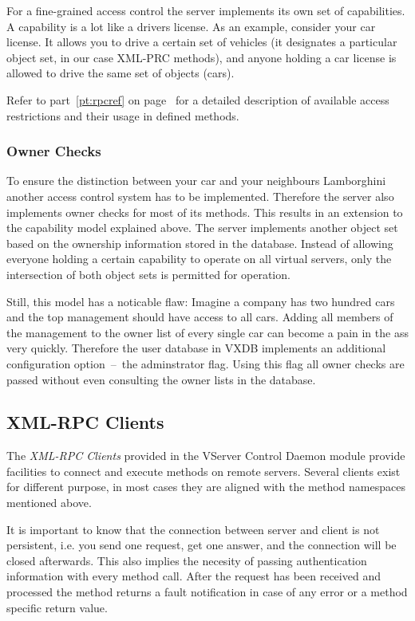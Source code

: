 For a fine-grained access control the server implements its own set of
capabilities.  A capability is a lot like a drivers license. As an example,
consider your car license. It allows you to drive a certain set of
vehicles (it designates a particular object set, in our case XML-PRC methods),
and anyone holding a car license is allowed to drive the same set of objects
(cars).

Refer to part~\ref{pt:rpcref} on page~\pageref{pt:rpcref} for a detailed
description of available access restrictions and their usage in defined methods.

\subsubsection{Owner Checks}

To ensure the distinction between your car and your neighbours Lamborghini
another access control system has to be implemented. Therefore the server also
implements owner checks for most of its methods. This results in an extension to
the capability model explained above. The server implements another object set
based on the ownership information stored in the database. Instead of allowing
everyone holding a certain capability to operate on all virtual servers, only
the intersection of both object sets is permitted for operation.

Still, this model has a noticable flaw: Imagine a company has two hundred cars
and the top management should have access to all cars. Adding all members
of the management to the owner list of every single car can become a pain in
the ass very quickly. Therefore the user database in VXDB implements an
additional configuration option~--~the adminstrator flag. Using this flag all
owner checks are passed without even consulting the owner lists in the database.


\subsection{XML-RPC Clients}

The \emph{XML-RPC Clients} provided in the VServer Control Daemon module
provide facilities to connect and execute methods on remote servers. Several
clients exist for different purpose, in most cases they are aligned with the
method namespaces mentioned above.

It is important to know that the connection between server and client is not
persistent, i.e. you send one request, get one answer, and the connection will
be closed afterwards. This also implies the necesity of passing authentication
information with every method call. After the request has been received and
processed the method returns a fault notification in case of any error or a
method specific return value.


